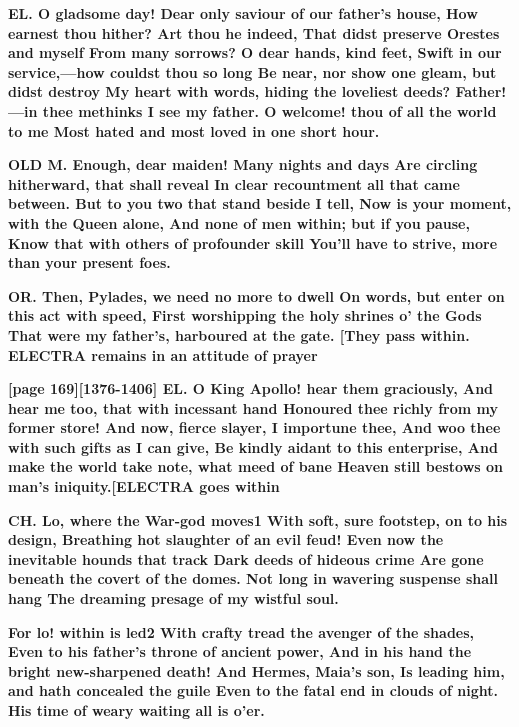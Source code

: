 \documentclass[11pt,letter]{book}
\begin{document}
\par \textbf{EL. O gladsome day! Dear only saviour of our father’s house, How earnest thou hither? Art thou he indeed, That didst preserve Orestes and myself From many sorrows? O dear hands, kind feet, Swift in our service,—how couldst thou so long Be near, nor show one gleam, but didst destroy My heart with words, hiding the loveliest deeds? Father!—in thee methinks I see my father. O welcome! thou of all the world to me Most hated and most loved in one short hour.}
\par 

\par \textbf{OLD M. Enough, dear maiden! Many nights and days Are circling hitherward, that shall reveal In clear recountment all that came between. But to you two that stand beside I tell, Now is your moment, with the Queen alone, And none of men within; but if you pause, Know that with others of profounder skill You’ll have to strive, more than your present foes.}
\par 

\par \textbf{OR. Then, Pylades, we need no more to dwell On words, but enter on this act with speed, First worshipping the holy shrines o’ the Gods That were my father’s, harboured at the gate. [They pass within. ELECTRA remains in an attitude of prayer}
\par 

\par \textbf{[page 169][1376-1406] EL. O King Apollo! hear them graciously, And hear me too, that with incessant hand Honoured thee richly from my former store! And now, fierce slayer, I importune thee, And woo thee with such gifts as I can give, Be kindly aidant to this enterprise, And make the world take note, what meed of bane Heaven still bestows on man’s iniquity.[ELECTRA goes within}
\par 

\par \textbf{CH. Lo, where the War-god moves1 With soft, sure footstep, on to his design, Breathing hot slaughter of an evil feud! Even now the inevitable hounds that track Dark deeds of hideous crime Are gone beneath the covert of the domes. Not long in wavering suspense shall hang The dreaming presage of my wistful soul.}
\par 

\par \textbf{For lo! within is led2 With crafty tread the avenger of the shades, Even to his father’s throne of ancient power, And in his hand the bright new-sharpened death! And Hermes, Maia’s son, Is leading him, and hath concealed the guile Even to the fatal end in clouds of night. His time of weary waiting all is o’er.}
\par 
\end{document}
